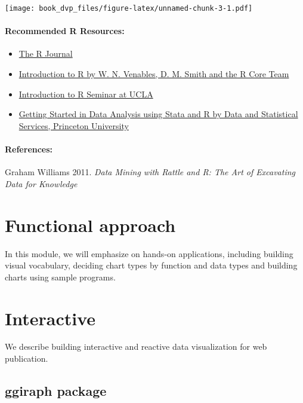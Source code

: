 \documentclass[
]{book}
\providecommand{\tightlist}{%
  \setlength{\itemsep}{0pt}\setlength{\parskip}{0pt}}
\begin{document}
\texttt{[image: book\_dvp\_files/figure-latex/unnamed-chunk-3-1.pdf]}

\hypertarget{recommended-r-resources}{%
\subsubsection{Recommended R Resources:}\label{recommended-r-resources}}

\begin{itemize}
\tightlist
\item
  \href{http://journal.r-project.org/}{The R Journal}
\item
  \href{http://cran.r-project.org/doc/manuals/R-intro.pdf}{Introduction to R by W. N. Venables, D. M. Smith and the R Core Team}
\item
  \href{http://www.ats.ucla.edu/stat/r/seminars/intro.htm}{Introduction to R Seminar at UCLA}
\item
  \href{https://dss.princeton.edu/training/}{Getting Started in Data Analysis using Stata and R by Data and Statistical Services, Princeton University}
\end{itemize}

\hypertarget{references}{%
\subsubsection{References:}\label{references}}

Graham Williams 2011. \emph{Data Mining with Rattle and R: The Art of Excavating Data for Knowledge}

\hypertarget{functional}{%
\chapter{Functional approach}\label{functional}}

In this module, we will emphasize on hands-on applications, including building visual vocabulary, deciding chart types by function and data types and building charts using sample programs.

\hypertarget{interactive}{%
\chapter{Interactive}\label{interactive}}

We describe building interactive and reactive data visualization for web publication.

\hypertarget{ggiraph-package}{%
\section{ggiraph package}\label{ggiraph-package}}
\end{document}
